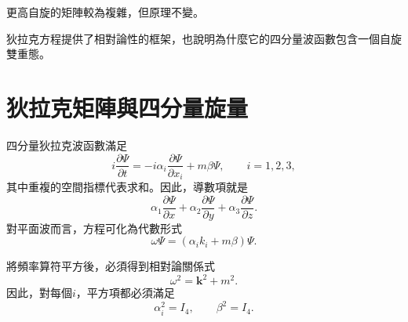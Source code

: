 更高自旋的矩陣較為複雜，但原理不變。

\begin{classroomqa}
\end{classroomqa}

\begin{classroomqa}
\end{classroomqa}

狄拉克方程提供了相對論性的框架，也說明為什麼它的四分量波函數包含一個自旋雙重態。

\section{狄拉克矩陣與四分量旋量}

四分量狄拉克波函數滿足
\begin{equation}
i\frac{\partial\Psi}{\partial t}
=
-i\alpha_i\frac{\partial\Psi}{\partial x_i}
+m\beta\Psi,
\qquad i=1,2,3,
\end{equation}
其中重複的空間指標代表求和。因此，導數項就是
\begin{equation}
\alpha_1\frac{\partial\Psi}{\partial x}
+\alpha_2\frac{\partial\Psi}{\partial y}
+\alpha_3\frac{\partial\Psi}{\partial z}.
\end{equation}
對平面波而言，方程可化為代數形式
\begin{equation}
\omega\Psi=(\alpha_i k_i+m\beta)\Psi.
\end{equation}

\begin{classroomqa}
\end{classroomqa}

將頻率算符平方後，必須得到相對論關係式
\begin{equation}
\omega^2=\mathbf{k}^2+m^2.
\end{equation}
因此，對每個\(i\)，平方項都必須滿足
\begin{equation}
\alpha_i^2=I_4,
\qquad
\beta^2=I_4.
\end{equation}

